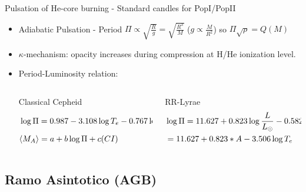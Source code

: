 \begin{frame}{Pulsation of He-core burning - Standard candles for PopI/PopII}
    \begin{itemize}
        \item Adiabatic Pulsation - Period $\Pi\propto\sqrt{\frac{R}{g}}=\sqrt{\frac{R^3}{M}}$ ($g\propto\frac{M}{R^2}$) so $\Pi\sqrt{\rho}=Q(M)$
        \item $\kappa$-mechanism: opacity increases during compression at H/He ionization level.
        \item Period-Luminosity relation:
            \begin{columns}[T]
                \begin{column}{0.5\textwidth}
                    Classical Cepheid
                    \begin{align*}
                        &\log{\Pi}=0.987-3.108\log{T_e}-0.767\log{\frac{M}{M_{\odot}{}}}+0.942\log{\frac{L}{L_{\odot}{}}}\\
                        &\langle M_A \rangle=a+b\log{\Pi}+c(CI)
                    \end{align*}
                \end{column}
                \begin{column}{0.5\textwidth}
                    RR-Lyrae
                    \begin{align*}
                        &\log{\Pi}=11.627+0.823\log{\frac{L}{L_{\odot}{}}}-0.582\log{\frac{M}{M_{\odot}{}}}-3.506\log{T_e}\\
                        &=11.627+0.823*A-3.506\log{T_e}
                    \end{align*}
                \end{column}
            \end{columns}
    \end{itemize}
\end{frame}

\subsection{Ramo Asintotico (AGB)}

